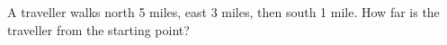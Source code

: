 A traveller walks north 5 miles, east 3 miles, then south 1 mile. How far is the traveller from the starting point?
